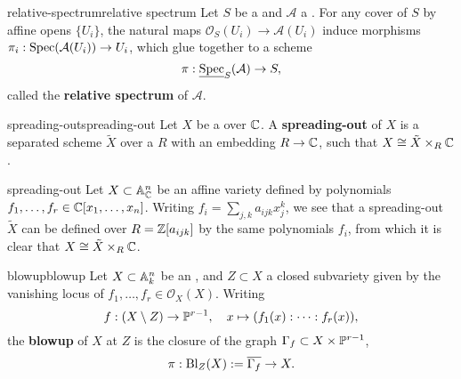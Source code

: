\begin{topic}{relative-spectrum}{relative spectrum}
    Let $S$ be a  and $\mathcal{A}$ a  . For any cover of $S$ by affine opens $\{ U_i \}$, the natural maps $\mathcal{O}_S(U_i) \to \mathcal{A}(U_i)$ induce morphisms $\pi_i : \Spec(\mathcal{A}(U_i)) \to U_i$, which glue together to a scheme
    \[ \pi : \underline{\Spec}_S(\mathcal{A}) \to S , \]
    called the \textbf{relative spectrum} of $\mathcal{A}$.
\end{topic}

\begin{topic}{spreading-out}{spreading-out}
    Let $X$ be a  over $\CC$. A \textbf{spreading-out} of $X$ is a separated scheme $\tilde{X}$ over a  $R$ with an embedding $R \to \CC$, such that $X \isom \tilde{X} \times_R \CC$.
\end{topic}

\begin{example}{spreading-out}
    Let $X \subset \AA^n_\CC$ be an affine variety defined by polynomials $f_1, \ldots, f_r \in \CC[x_1, \ldots, x_n]$. Writing $f_i = \sum_{j, k} a_{ijk} x_j^k$, we see that a spreading-out $\tilde{X}$ can be defined over $R = \ZZ[a_{ijk}]$ by the same polynomials $f_i$, from which it is clear that $X \isom \tilde{X} \times_R \CC$.
\end{example}


\begin{topic}{blowup}{blowup}
    Let $X \subset \AA^n_k$ be an , and $Z \subset X$ a closed subvariety given by the vanishing locus of $f_1, \ldots, f_r \in \mathcal{O}_X(X)$. Writing
    \[ f : (X \setminus Z) \to \PP^{r - 1}, \quad x \mapsto (f_1(x) : \cdots : f_r(x)) , \]
    the \textbf{blowup} of $X$ at $Z$ is the closure of the graph $\Gamma_f \subset X \times \PP^{r - 1}$,
    \[ \pi : \textup{Bl}_Z(X) := \overline{\Gamma_f} \to X . \]
\end{topic}

